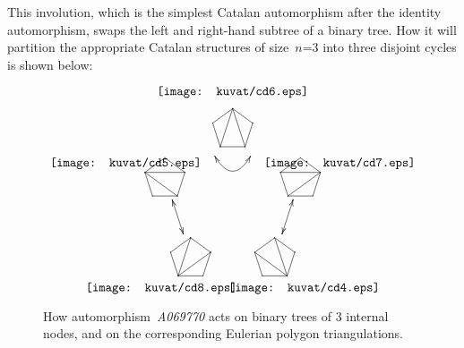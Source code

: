 \documentclass[11pt]{article} %
\newcommand{\catint}[1]{({\it #1})}
\newcommand{\autname}[1]{{\it *#1}}
\newcommand{\automorphism}[1]{automorphism~\autname{#1}}
\begin{document}
\thickspace
\thickspace

This involution, which is the simplest Catalan automorphism after the identity
automorphism, swaps the left and right-hand subtree of a binary tree.
How it will partition the appropriate Catalan structures of size~$n$=3
into three disjoint cycles is shown below:


\begin{figure}[!ht]
\begin{center}
\[
\xy
(0,30)*{\texttt{[image: kuvat/cd6.eps]}}="1o";
(0,20)*+{ \xy 0;/r.07pc/:
(0,20)*{}="1";
(19,6.2)*{}="2";
(11.8,-16.2)*{}="3";
(-11.8,-16.2)*{}="4";
(-19,6.2)*{}="5";
{\ar@{-} "1";"2"};
{\ar@{-} "3";"2"};
{\ar@{-} "4";"3"};
{\ar@{-} "5";"4"};
{\ar@{-} "5";"1"};
{\ar@{-} "1";"3"};
{\ar@{-} "1";"4"};
\endxy}="1";
(30,10)*{\texttt{[image: kuvat/cd7.eps]}}="2o";
(19,6.2)*+{ \xy 0;/r.07pc/:
(0,20)*{}="1";
(19,6.2)*{}="2";
(11.8,-16.2)*{}="3";
(-11.8,-16.2)*{}="4";
(-19,6.2)*{}="5";
{\ar@{-} "1";"2"};
{\ar@{-} "3";"2"};
{\ar@{-} "4";"3"};
{\ar@{-} "5";"4"};
{\ar@{-} "5";"1"};
{\ar@{-} "2";"4"};
{\ar@{-} "2";"5"};
\endxy}="2";
(20,-25)*{\texttt{[image: kuvat/cd4.eps]}}="3o";
(11.8,-16.2)*+{ \xy 0;/r.07pc/:
(0,20)*{}="1";
(19,6.2)*{}="2";
(11.8,-16.2)*{}="3";
(-11.8,-16.2)*{}="4";
(-19,6.2)*{}="5";
{\ar@{-} "1";"2"};
{\ar@{-} "3";"2"};
{\ar@{-} "4";"3"};
{\ar@{-} "5";"4"};
{\ar@{-} "5";"1"};
{\ar@{-} "3";"5"};
{\ar@{-} "3";"1"};
\endxy}="3";
(-20,-25)*{\texttt{[image: kuvat/cd8.eps]}}="4o";
(-11.8,-16.2)*+{ \xy 0;/r.07pc/:
(0,20)*{}="1";
(19,6.2)*{}="2";
(11.8,-16.2)*{}="3";
(-11.8,-16.2)*{}="4";
(-19,6.2)*{}="5";
{\ar@{-} "1";"2"};
{\ar@{-} "3";"2"};
{\ar@{-} "4";"3"};
{\ar@{-} "5";"4"};
{\ar@{-} "5";"1"};
{\ar@{-} "4";"1"};
{\ar@{-} "4";"2"};
\endxy}="4";
(-30,10)*{\texttt{[image: kuvat/cd5.eps]}}="5o";
(-19,6.2)*+{ \xy 0;/r.07pc/:
(0,20)*{}="1";
(19,6.2)*{}="2";
(11.8,-16.2)*{}="3";
(-11.8,-16.2)*{}="4";
(-19,6.2)*{}="5";
{\ar@{-} "1";"2"};
{\ar@{-} "3";"2"};
{\ar@{-} "4";"3"};
{\ar@{-} "5";"4"};
{\ar@{-} "5";"1"};
{\ar@{-} "5";"2"};
{\ar@{-} "5";"3"};
\endxy}="5";
{\ar@{<->}@/_1pc/ (-5,12); (+5,12)};
{\ar@{<->} "2";"3"};
{\ar@{<->} "4";"5"};
\endxy
\]
\caption{How \automorphism{A069770} acts
on binary trees of 3 internal nodes, and on the corresponding
Eulerian polygon triangulations.}
\end{center}
\end{figure}
\end{document}
